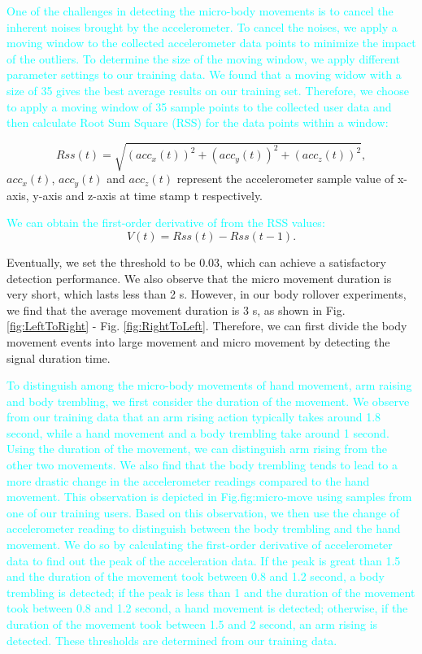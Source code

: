 \textcolor{cyan}{One of the challenges in detecting the micro-body movements is to cancel the inherent noises brought by the accelerometer.
To cancel the noises, we apply a moving window to the collected accelerometer data points to minimize the impact of the outliers. To
determine the size of the moving window, we apply different parameter settings to our training data. We found that a moving widow with a
size of 35 gives the best average results on our training set. Therefore, we choose to apply a moving window of 35 sample points to the
collected user data and then calculate Root Sum Square (RSS) for the data points within a window:}

\begin{equation}
      Rss(t) =\sqrt{(acc_x(t))^{2}+(acc_y(t))^{2}+(acc_z(t))^{2}},
\end{equation}
$acc_x(t)$, $acc_y(t)$ and $acc_z(t)$ represent the accelerometer sample value of x-axis, y-axis and z-axis at time stamp t respectively.


\textcolor{cyan}{We can obtain the first-order derivative of from the RSS values:}
\begin{equation}
      V(t)=Rss(t)-Rss(t-1).
\end{equation}

Eventually, we set the threshold to be 0.03, which can achieve a satisfactory detection performance. We also observe that the micro movement duration is very short, which lasts less than 2 s.
However, in our body rollover experiments, we find that the average movement duration is 3 s, as shown in Fig. \ref{fig:LeftToRight} - Fig. \ref{fig:RightToLeft}.
Therefore, we can first divide the body movement events into large movement and micro movement by detecting the signal duration time.

\textcolor{cyan}{To distinguish among the micro-body movements of hand movement, arm raising and body trembling, we first consider the
duration of the movement. We observe from our training data that an arm rising action typically takes around 1.8 second, while a hand
movement and a body trembling take around 1 second. Using the duration of the movement, we can distinguish arm rising from the other two
movements. We also find that the body trembling tends to lead to a more drastic change in the accelerometer readings compared to the hand
movement. This observation is depicted in Fig.{fig:micro-move} using samples from one of our training users. Based on this observation, we
then use the change of accelerometer reading to distinguish between the body trembling and the hand movement. We do so by calculating the
first-order derivative of accelerometer data to find out the peak of the acceleration data.  If the peak is great than 1.5 and the duration
of the movement took between 0.8 and 1.2 second, a body trembling is detected; if the peak is less than 1 and the duration of the movement
took between 0.8 and 1.2 second, a hand movement is detected; otherwise, if the duration of the movement took between 1.5 and 2 second, an
arm rising is detected. These thresholds are determined from our training data.}

